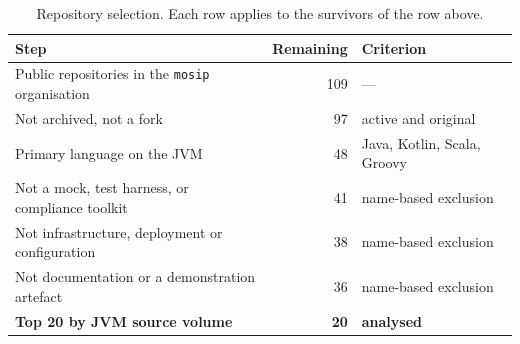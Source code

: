 %
%
%


\begin{table}[htbp]
\centering
\caption{Repository selection. Each row applies to the survivors of the row
above.}
\label{tab:selection}
\small
\begin{tabular}{@{}lrl@{}}
\toprule
Step & Remaining & Criterion \\
\midrule
Public repositories in the \texttt{mosip} organisation & 109 & --- \\
Not archived, not a fork                               &  97 & active and original \\
Primary language on the JVM                            &  48 & Java, Kotlin, Scala, Groovy \\
Not a mock, test harness, or compliance toolkit        &  41 & name-based exclusion \\
Not infrastructure, deployment or configuration        &  38 & name-based exclusion \\
Not documentation or a demonstration artefact          &  36 & name-based exclusion \\
\midrule
\textbf{Top 20 by JVM source volume}                   & \textbf{20} & \textbf{analysed} \\
\bottomrule
\end{tabular}
\end{table}


